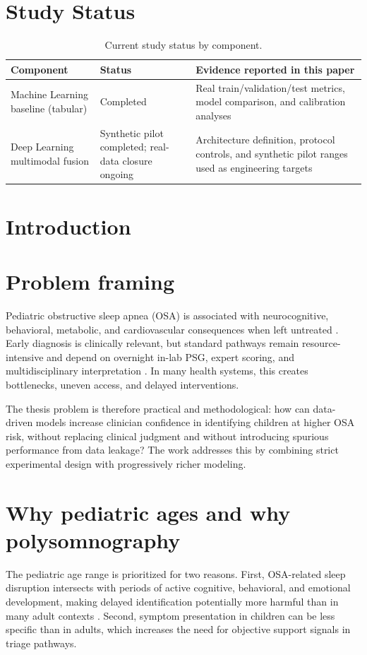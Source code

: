 \documentclass[10pt,a4paper,twocolumn]{article}
\newcommand{\chapter}[1]{\section{#1}}
\begin{document}
\section*{Study Status}
\begin{table}[t]
\centering
\small
\caption{Current study status by component.}
\label{tab:evidence_status}
\begin{tabular}{p{3.4cm}p{5.1cm}p{5.1cm}}
\toprule
Component & Status & Evidence reported in this paper \\
\midrule
Machine Learning baseline (tabular) & Completed & Real train/validation/test metrics, model comparison, and calibration analyses \\
Deep Learning multimodal fusion & Synthetic pilot completed; real-data closure ongoing & Architecture definition, protocol controls, and synthetic pilot ranges used as engineering targets \\
\bottomrule
\end{tabular}
\end{table}

\chapter{Introduction}
\section{Problem framing}
Pediatric obstructive sleep apnea (OSA) is associated with neurocognitive, behavioral, metabolic, and cardiovascular consequences when left untreated \citep{gozal2008,paruthi2018,solano2023}. Early diagnosis is clinically relevant, but standard pathways remain resource-intensive and depend on overnight in-lab PSG, expert scoring, and multidisciplinary interpretation \citep{berry2023,rundo2019}. In many health systems, this creates bottlenecks, uneven access, and delayed interventions.

The thesis problem is therefore practical and methodological: how can data-driven models increase clinician confidence in identifying children at higher OSA risk, without replacing clinical judgment and without introducing spurious performance from data leakage? The work addresses this by combining strict experimental design with progressively richer modeling.

\section{Why pediatric ages and why polysomnography}
The pediatric age range is prioritized for two reasons. First, OSA-related sleep disruption intersects with periods of active cognitive, behavioral, and emotional development, making delayed identification potentially more harmful than in many adult contexts \citep{beebe2006,vlahandonis2013,gupta2024}. Second, symptom presentation in children can be less specific than in adults, which increases the need for objective support signals in triage pathways.
\end{document}

